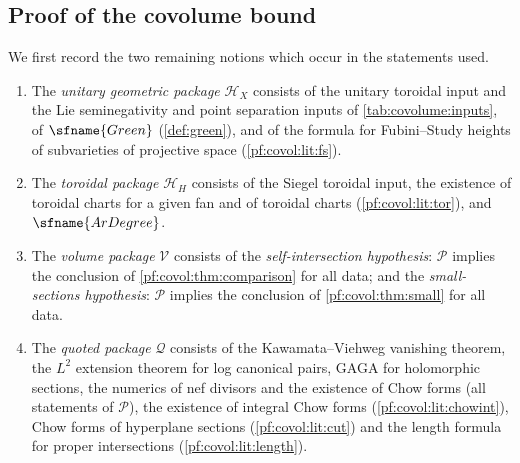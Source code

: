 \subsection{Proof of the covolume bound}\label{sec:pf:covol:main}

We first record the two remaining notions which occur in the statements used.

\begin{definition}\label{pf:covol:def:packages}
\begin{enumerate}[label=(\alph*)]
\item The \emph{unitary geometric package} $\mathcal H_X$ consists of the unitary toroidal input and the
  Lie seminegativity and point separation inputs of \cref{tab:covolume:inputs}, of $\sfname{Green}$
  (\cref{def:green}), and of the formula for Fubini--Study heights of subvarieties of projective space
  (\cref{pf:covol:lit:fs}).
\item The \emph{toroidal package} $\mathcal H_H$ consists of the Siegel toroidal input, the existence of
  toroidal charts for a given fan and of toroidal charts (\cref{pf:covol:lit:tor}), and $\sfname{ArDegree}$.
\item The \emph{volume package} $\mathcal V$ consists of the \emph{self-intersection hypothesis}: $\mathcal P$
  implies the conclusion of \cref{pf:covol:thm:comparison} for all data; and the \emph{small-sections
  hypothesis}: $\mathcal P$ implies the conclusion of \cref{pf:covol:thm:small} for all data.
\item The \emph{quoted package} $\mathcal Q$ consists of the Kawamata--Viehweg vanishing theorem, the
  $L^2$ extension theorem for log canonical pairs, GAGA for holomorphic sections, the numerics of nef
  divisors and the existence of Chow forms (all statements of $\mathcal P$), the existence of integral
  Chow forms (\cref{pf:covol:lit:chowint}), Chow forms of hyperplane sections (\cref{pf:covol:lit:cut}) and
  the length formula for proper intersections (\cref{pf:covol:lit:length}).
\end{enumerate}
%
\end{definition}

